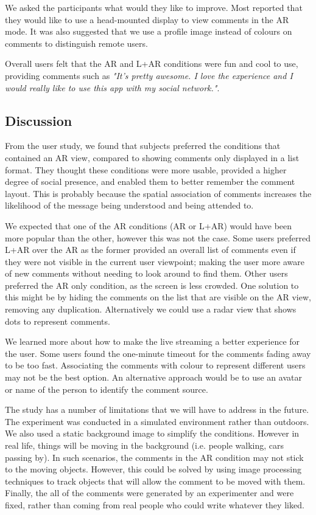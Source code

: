 We asked the participants what would they like to improve. Most reported that they would like to use a head-mounted display to view comments in the AR mode.  It was also suggested that we use a profile image instead of colours on comments to distinguish remote users.
 
Overall users felt that the AR and L+AR conditions were fun and cool to use, providing comments such as \textit{"It's pretty awesome. I love the experience and I would really like to use this app with my social network."}.


\subsection{Discussion}

From the user study, we found that subjects preferred the conditions that contained an AR view, compared to showing comments only displayed in a list format. They thought these conditions were more usable, provided a higher degree of social presence, and enabled them to better remember the comment layout. This is probably because the spatial association of comments increases the likelihood of the message being understood and being attended to.

We expected that one of the AR conditions (AR or L+AR) would have been more popular than the other, however this was not the case. Some users preferred L+AR over the AR as the former provided an overall list of comments even if they were not visible in the current user viewpoint; making the user more aware of new comments without needing to look around to find them. Other users preferred the AR only condition, as the screen is less crowded. One solution to this might be by hiding the comments on the list that are visible on the AR view, removing any duplication. Alternatively we could use a radar view that shows dots to represent comments. 

We learned more about how to make the live streaming a better experience for the user. Some users found the one-minute timeout for the comments fading away to be too fast. Associating the comments with colour to represent different users may not be the best option. An alternative approach would be to use an avatar or name of the person to identify the comment source. 

The study has a number of limitations that we will have to address in the future. The experiment was conducted in a simulated environment rather than outdoors. We also used a static background image to simplify the conditions. However in real life, things will be moving in the background (i.e. people walking, cars passing by). In such scenarios, the comments in the AR condition may not stick to the moving objects. However, this could be solved by using image processing techniques to track objects that will allow the comment to be moved with them. Finally, the all of the comments were generated by an experimenter and were fixed, rather than coming from real people who could write whatever they liked.    

